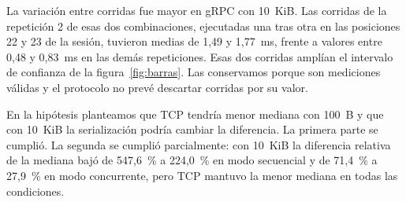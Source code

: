 La variación entre corridas fue mayor en gRPC con 10~KiB. Las corridas de la repetición 2 de esas dos combinaciones, ejecutadas una tras otra en las posiciones 22 y 23 de la sesión, tuvieron medias de 1,49 y 1,77~ms, frente a valores entre 0,48 y 0,83~ms en las demás repeticiones. Esas dos corridas amplían el intervalo de confianza de la figura~\ref{fig:barras}. Las conservamos porque son mediciones válidas y el protocolo no prevé descartar corridas por su valor.

En la hipótesis planteamos que TCP tendría menor mediana con 100~B y que con 10~KiB la serialización podría cambiar la diferencia. La primera parte se cumplió. La segunda se cumplió parcialmente: con 10~KiB la diferencia relativa de la mediana bajó de 547,6~\% a 224,0~\% en modo secuencial y de 71,4~\% a 27,9~\% en modo concurrente, pero TCP mantuvo la menor mediana en todas las condiciones.
